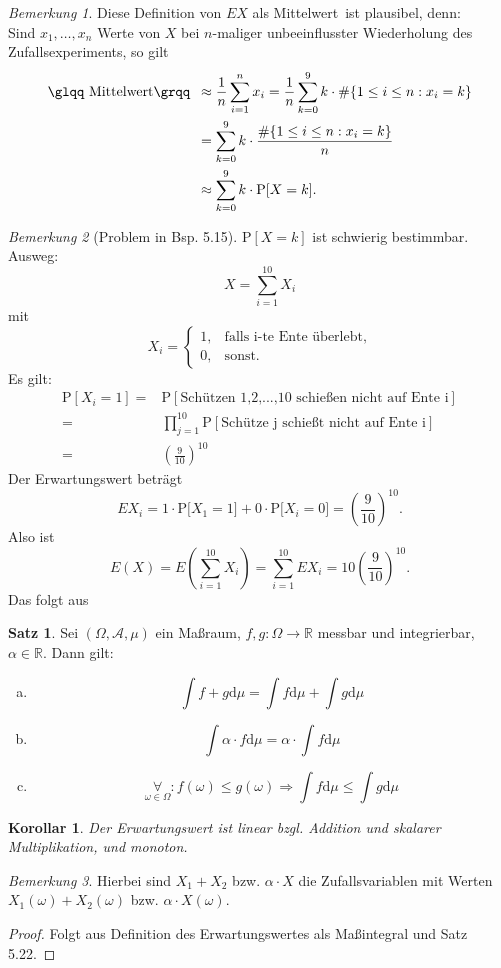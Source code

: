 \documentclass[a4paper,12pt,fleqn]{scrartcl}
\newcommand{\R}{\mathbb{R}}
\newcommand{\m}[1]{\mathcal{ #1 }}
\newcommand{\pe}[1]{\text{P[} #1 \text{]}}
\newcommand{\ZE}{Zufallsexperiment}
\newcommand{\ZV}{Zufallsvariable}
\newcommand{\impl}{\Rightarrow}
\newcommand{\fa}[1]{\mathop{\forall}\limits_{#1}}
\theoremstyle{definition}
\newtheorem{satz}[definition]{Satz}
\theoremstyle{plain}
\newtheorem{korollar}[definition]{Korollar}
\theoremstyle{remark}
\newtheorem*{bemerkung}{Bemerkung}
\begin{document}
\begin{bemerkung}
Diese Definition von $EX$ als \glqq Mittelwert\grqq \, ist plausibel, denn: \\
Sind $x_1, \ldots , x_n$ Werte von $X$ bei $n$-maliger unbeeinflusster Wiederholung des \ZE s, so gilt
\begin{align*}
\text{\glqq Mittelwert\grqq \,} &\approx \frac{1}{n} \sum_{i=1}^n x_i = \frac{1}{n} \sum_{k=0}^9 k \cdot \# \{1 \leq i \leq n : x_i = k\} \\
&= \sum_{k=0}^9 k \cdot \frac{\# \{1 \leq i \leq n : x_i = k\}}{n} \\
&\approx \sum_{k=0}^9 k \cdot \text{P}[X=k].
\end{align*}
\end{bemerkung}

\begin{bemerkung}[Problem in Bsp. 5.15]
$\mathrm{P}[X=k]$ ist schwierig bestimmbar. Ausweg:
\[X=\sum_{i=1}^{10}X_i\]
mit
\[X_i=\begin{cases}1,&\text{falls i-te Ente überlebt,}\\0,&\text{sonst.}
\end{cases}
\]
Es gilt:
\begin{align*}
\text{P}[X_i=1]=&\text{P}[\text{Schützen 1,2,...,10 schießen nicht auf Ente i}]\\
=&\prod_{j=1}^{10}\text{P}[\text{Schütze j schießt nicht auf Ente i}]\\
=&(\frac{9}{10})^{10}
\end{align*}
Der Erwartungswert beträgt
\[EX_i=1\cdot \pe{ X_1=1}+0\cdot \pe{ X_i=0}=(\frac{9}{10})^{10}.\]
Also ist
\[E(X)=E(\sum_{i=1}^{10}X_i)=\sum_{i=1}^{10}EX_i=10(\frac{9}{10})^{10}.\]
Das folgt aus
\end{bemerkung}
\begin{satz}
Sei $(\Omega,\m{A},\mu)$ ein Maßraum, $f,g:\Omega\to\R$ messbar und integrierbar, $\alpha\in\R$. Dann gilt:
\begin{enumerate}[a)]
\item \[\int f+g\mathrm{d}\mu =\int f\mathrm{d}\mu +\int g\mathrm{d}\mu\]
\item \[\int \alpha\cdot f\mathrm{d}\mu=\alpha\cdot\int f\mathrm{d}\mu\]
\item \[\fa{\omega\in\Omega}:f(\omega)\leq g(\omega)\impl\int f\mathrm{d}\mu\leq\int g\mathrm{d}\mu\]
\end{enumerate}
\end{satz}
\begin{korollar}
Der Erwartungswert ist linear bzgl. Addition und skalarer Multiplikation, und monoton.
\end{korollar}
\begin{bemerkung}
Hierbei sind $X_1+X_2$ bzw. $\alpha\cdot X$ die \ZV n mit Werten $X_1(\omega)+X_2(\omega)$ bzw. $\alpha\cdot X(\omega)$. 
\end{bemerkung}
\begin{proof}
Folgt aus Definition des Erwartungswertes als Maßintegral und Satz 5.22.
\end{proof}
\end{document}
